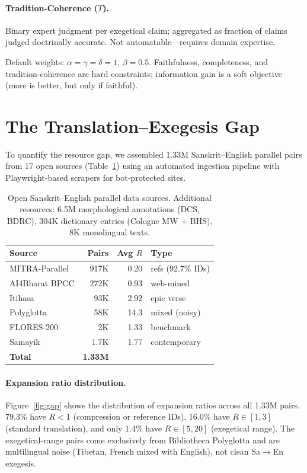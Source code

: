 \documentclass[11pt]{article}
\begin{document}
\paragraph{Tradition-Coherence ($T$).} Binary expert judgment per exegetical claim; aggregated as fraction of claims judged doctrinally accurate. Not automatable---requires domain expertise.

Default weights: $\alpha = \gamma = \delta = 1$, $\beta = 0.5$. Faithfulness, completeness, and tradition-coherence are hard constraints; information gain is a soft objective (more is better, but only if faithful).


\section{The Translation--Exegesis Gap}
\label{sec:gap}

To quantify the resource gap, we assembled 1.33M Sanskrit--English parallel pairs from 17 open sources (Table~\ref{tab:sources}) using an automated ingestion pipeline with Playwright-based scrapers for bot-protected sites.

\begin{table}[t]
\centering
\small
\begin{tabular}{@{}lrrl@{}}
\toprule
\textbf{Source} & \textbf{Pairs} & \textbf{Avg $R$} & \textbf{Type} \\
\midrule
MITRA-Parallel & 917K & 0.20 & refs (92.7\% IDs) \\
AI4Bharat BPCC & 272K & 0.93 & web-mined \\
Itihasa & 93K & 2.92 & epic verse \\
Polyglotta & 58K & 14.3 & mixed (noisy) \\
FLORES-200 & 2K & 1.33 & benchmark \\
Samayik & 1.7K & 1.77 & contemporary \\
\midrule
\textbf{Total} & \textbf{1.33M} & & \\
\bottomrule
\end{tabular}
\caption{Open Sanskrit--English parallel data sources. Additional resources: 6.5M morphological annotations (DCS, BDRC), 304K dictionary entries (Cologne MW + BHS), 8K monolingual texts.}
\label{tab:sources}
\end{table}

\paragraph{Expansion ratio distribution.}
Figure~\ref{fig:gap} shows the distribution of expansion ratios across all 1.33M pairs. 79.3\% have $R < 1$ (compression or reference IDs), 16.0\% have $R \in [1, 3]$ (standard translation), and only 1.4\% have $R \in [5, 20]$ (exegetical range). The exegetical-range pairs come exclusively from Bibliotheca Polyglotta and are multilingual noise (Tibetan, French mixed with English), not clean Sa$\rightarrow$En exegesis.
\end{document}
